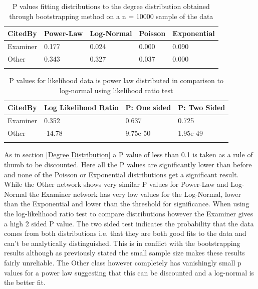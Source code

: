 \begin{table}
\caption{P values fitting distributions to the degree distribution obtained through bootstrapping method on a n = 10000 sample of the data}
\label{tab:distributionsColouredP}
\centering
\begin{tabular}{l l l l l}
\toprule
CitedBy & Power-Law & Log-Normal & Poisson & Exponential \\
\midrule
Examiner & 0.177 & 0.024 & 0.000 & 0.090 \\
Other & 0.343 & 0.327 & 0.037 & 0.000 \\
\bottomrule\\
\end{tabular}
\end{table}

\begin{table}
\caption{P values for likelihood data is power law distributed in comparison to log-normal using likelihood ratio test}
\label{tab:distributionsColouredP2}
\centering
\begin{tabular}{l l l l}
\toprule
CitedBy & Log Likelihood Ratio & P: One sided & P: Two Sided \\
\midrule
Examiner & 0.352 & 0.637 & 0.725 \\
Other & -14.78 &9.75e-50 & 1.95e-49 \\
\bottomrule\\
\end{tabular}
\end{table}

As in section \ref{Degree Distribution} a P value of less than 0.1 is taken as a rule of thumb to be discounted. Here all the P values are significantly lower than before and none of the Poisson or Exponential distributions get a significant result. While the Other network shows very similar P values for Power-Law and Log-Normal the Examiner network has very low values for the Log-Normal, lower than the Exponential and lower than the threshold for significance. When using the log-likelihood ratio test to compare distributions however the Examiner gives a high 2 sided P value. The two sided test indicates the probability that the data comes from both distributions i.e. that they are both good fits to the data and can't be analytically distinguished. This is in conflict with the bootstrapping results although as previously stated the small sample size makes these results fairly unreliable. The Other class however completely has vanishingly small p values for a power law suggesting that this can be discounted and a log-normal is the better fit. 

